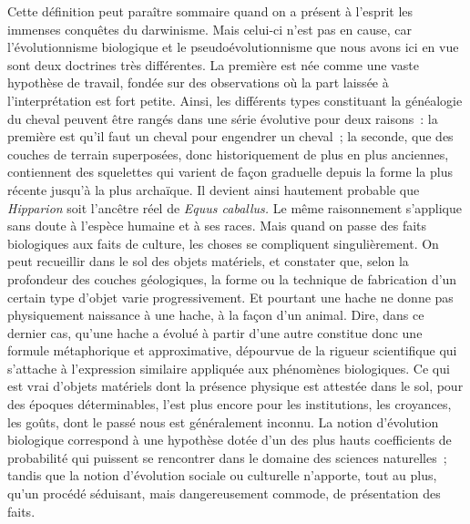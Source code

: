 \documentclass[french,twoside]{book} %
\begin{document}
Cette définition peut paraître sommaire quand on a présent à l’esprit les immenses conquêtes du darwinisme. Mais celui-ci n’est pas en cause, car l’évolutionnisme biologique et le pseudoévolutionnisme que nous avons ici en vue sont deux doctrines très différentes. La première est née comme une vaste hypothèse de travail, fondée sur des observations où la part laissée à l’interprétation est fort petite. Ainsi, les différents types constituant la généalogie du cheval peuvent être rangés dans une série évolutive pour deux raisons : la première est qu’il faut un cheval pour engendrer un cheval ; la seconde, que des couches de terrain superposées, donc historiquement de plus en plus anciennes, contiennent des squelettes qui varient de façon graduelle depuis la forme la plus récente jusqu’à la plus archaïque. Il devient ainsi hautement probable que \emph{Hipparion} soit l’ancêtre réel de \emph{Equus caballus.} Le même raisonnement s’applique sans doute à l’espèce humaine et à ses races. Mais quand on passe des faits biologiques aux faits de culture, les choses se compliquent singulièrement. On peut recueillir dans le sol des objets matériels, et constater que, selon la profondeur des couches géologiques, la forme ou la technique de fabrication d’un certain type d’objet varie progressivement. Et pourtant une hache ne donne pas physiquement naissance à une hache, à la façon d’un animal. Dire, dans ce dernier cas, qu’une hache a évolué à partir d’une autre constitue donc une formule métaphorique et approximative, dépourvue de la rigueur scientifique qui s’attache à l’expression similaire appliquée aux phénomènes biologiques. Ce qui est vrai d’objets matériels dont la présence physique est attestée dans le sol, pour des époques déterminables, l’est plus encore pour les institutions, les croyances, les goûts, dont le passé nous est généralement inconnu. La notion d’évolution biologique correspond à une hypothèse dotée d’un des plus hauts coefficients de probabilité qui puissent se rencontrer dans le domaine des sciences naturelles ; tandis que la notion d’évolution sociale ou culturelle n’apporte, tout au plus, qu’un procédé séduisant, mais dangereusement commode, de présentation des faits.\par
\end{document}
